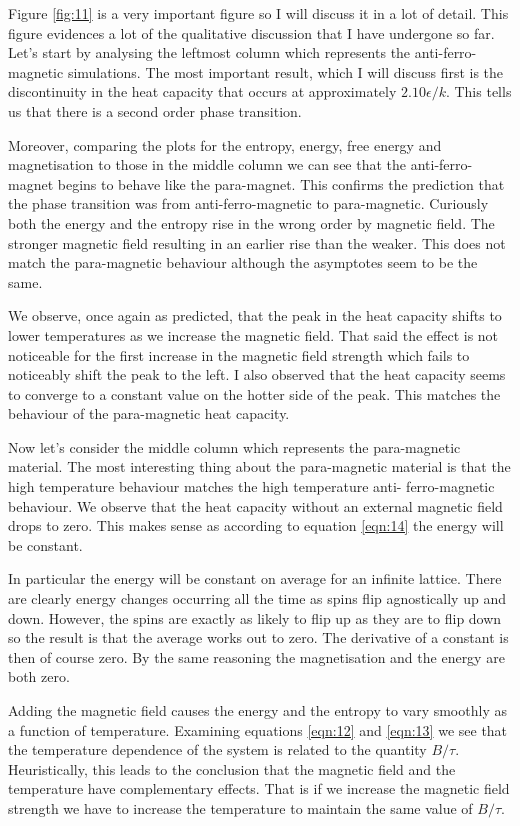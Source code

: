 \documentclass[a4paper, twocolumn]{article}
\begin{document}
Figure \ref{fig:11} is a very important figure so I will discuss it in %
a lot of detail. This figure evidences a lot of the qualitative discussion %
that I have undergone so far. Let's start by analysing the leftmost %
column which represents the anti-ferro-magnetic simulations. The most %
important result, which I will discuss first is the discontinuity in the %
heat capacity that occurs at approximately \(2.10 \epsilon / k\). This %
tells us that there is a second order phase transition. 


Moreover, comparing the plots for the entropy, energy, free energy and %
magnetisation to those in the middle column we can see that the %
anti-ferro-magnet begins to behave like the para-magnet. This confirms %
the prediction that the phase transition was from anti-ferro-magnetic %
to para-magnetic. Curiously both the energy and the entropy rise %
in the wrong order by magnetic field. The stronger magnetic field %
resulting in an earlier rise than the weaker. This does not match %
the para-magnetic behaviour although the asymptotes seem to be the same. 


We observe, once again as predicted, that the peak in the heat capacity %
shifts to lower temperatures as we increase the magnetic field. That said %
the effect is not noticeable for the first increase in the magnetic field %
strength which fails to noticeably shift the peak to the left. I also %
observed that the heat capacity seems to converge to a constant value %
on the hotter side of the peak. This matches the behaviour of the %
para-magnetic heat capacity. 


Now let's consider the middle column which represents the para-magnetic %
material. The most interesting thing about the para-magnetic material %
is that the high temperature behaviour matches the high temperature anti-%
ferro-magnetic behaviour. We observe that the heat capacity without an %
external magnetic field drops to zero. This makes sense as according to %
equation \ref{eqn:14} the energy will be constant. 


In particular the energy will be constant on average for an infinite %
lattice. There are clearly energy changes occurring all the time as %
spins flip agnostically up and down. However, the spins are exactly %
as likely to flip up as they are to flip down so the result is that %
the average works out to zero. The derivative of a constant is then %
of course zero. By the same reasoning the magnetisation and the energy %
are both zero. 


Adding the magnetic field causes the energy and the entropy to vary %
smoothly as a function of temperature. Examining equations \ref{eqn:12} %
and \ref{eqn:13} we see that the temperature dependence of the system %
is related to the quantity \(B / \tau\). Heuristically, this leads to %
the conclusion that the magnetic field and the temperature have %
complementary effects. That is if we increase the magnetic field strength %
we have to increase the temperature to maintain the same value of %
\(B / \tau\). 
\end{document}
